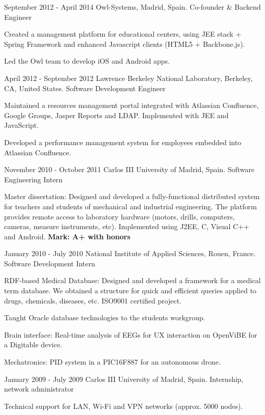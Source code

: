 \experience
  {September 2012 - April 2014}
  {Owl-Systems, Madrid, Spain.}
  {Co-founder \& Backend Engineer}
  {\vspace{-1em}\begin{rlist}
    \item Created a management platform for educational centers, using JEE stack + Spring
    Framework and enhanced Javascript clients (HTML5 + Backbone.js).
    \item Led the Owl team to develop iOS and Android apps.
  \end{rlist}}

\experience
  {April 2012 - September 2012}
  {Lawrence Berkeley National Laboratory, Berkeley, CA, United States.}
  {Software Development Engineer}
  {\vspace{-1em}\begin{rlist}
    \item Maintained a resources management portal integrated with Atlassian Confluence,
    Google Groups, Jasper Reports and LDAP. Implemented with JEE and JavaScript.
    \item Developed a performance management system for employees embedded into Atlassian Confluence.
  \end{rlist}}

\experience
  {November 2010 - October 2011}
  {Carlos III University of Madrid, Spain.}
  {Software Engineering Intern}
  {\vspace{-1em}\begin{rlist}
    \item Master dissertation: Designed and developed a fully-functional distributed system
    for teachers and students of mechanical and industrial engineering. The platform provides
    remote access to laboratory hardware (motors, drills, computers, cameras, measure
    instruments, etc). Implemented using J2EE, C, Visual C++ and Android.
    \textbf{Mark: A+ with honors}
  \end{rlist}}

\experience
  {January 2010 - July 2010}
  {National Institute of Applied Sciences, Rouen, France.}
  {Software Development Intern}
  {\vspace{-1em}\begin{rlist}
    \item RDF-based Medical Database: Designed and developed a framework for a medical
    term database. We obtained a structure for quick and efficient queries applied
    to drugs, chemicals, diseases, etc. ISO9001 certified project.
    \item Taught Oracle database technologies to the students workgroup.
    \item Brain interface: Real-time analysis of EEGs for UX interaction on OpenViBE for a Digitable device.
    \item Mechatronics: PID system in a PIC16F887 for an autonomous drone.
  \end{rlist}}

\experience
  {January 2009 - July 2009}
  {Carlos III University of Madrid, Spain.}
  {Internship, network administrator}
  {\vspace{-1em}\begin{rlist}
    \item Technical support for LAN, Wi-Fi and VPN networks (approx. 5000 nodes).
  \end{rlist}}
